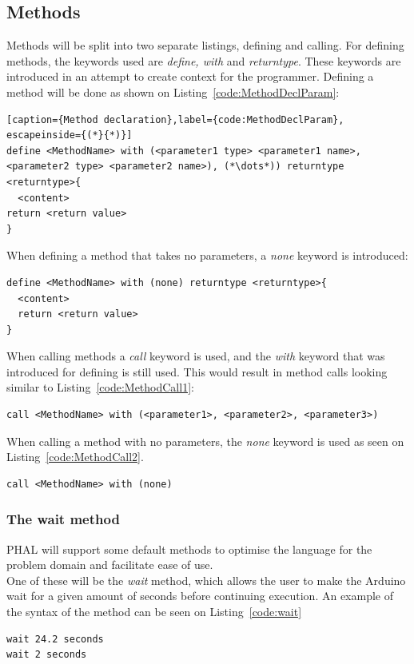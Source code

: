\subsection{Methods}
Methods will be split into two separate listings, defining and calling. 
For defining methods, the keywords used are \textit{define, with} and \textit{returntype}. 
These keywords are introduced in an attempt to create context for the programmer. 
Defining a method will be done as shown on Listing~\ref{code:MethodDeclParam}:
\begin{lstlisting}[caption={Method declaration},label={code:MethodDeclParam}, escapeinside={(*}{*)}]
define <MethodName> with (<parameter1 type> <parameter1 name>, <parameter2 type> <parameter2 name>), (*\dots*)) returntype <returntype>{
  <content>
return <return value>
}
\end{lstlisting}
When defining a method that takes no parameters, a \textit{none} keyword is introduced:
\begin{lstlisting}[caption={Method declaration},label={code:MethodDeclNoParam}]
define <MethodName> with (none) returntype <returntype>{
  <content>
  return <return value>
}
\end{lstlisting}
When calling methods a \textit{call} keyword is used, and the \textit{with} keyword that was introduced for defining is still used. This would result in method calls looking similar to Listing~\ref{code:MethodCall1}:\\
\begin{lstlisting}[caption={Example of a \textit{method call} with parameters},label={code:MethodCall1}]
call <MethodName> with (<parameter1>, <parameter2>, <parameter3>)
\end{lstlisting}
When calling a method with no parameters, the \textit{none} keyword is used as seen on Listing~\ref{code:MethodCall2}.
\\
\begin{lstlisting}[caption={Example of a \textit{Method call} without parameters},label={code:MethodCall2}]
call <MethodName> with (none)
\end{lstlisting}

\subsubsection{The wait method}
PHAL will support some default methods to optimise the language for the problem domain and facilitate ease of use.\\
One of these will be the \textit{wait} method, which allows the user to make the Arduino wait for a given amount of seconds before continuing execution. An example of the syntax of the method can be seen on Listing~\ref{code:wait}\\ \begin{lstlisting}[caption={Example of the wait method},label={code:wait}]
wait 24.2 seconds
wait 2 seconds
\end{lstlisting}

